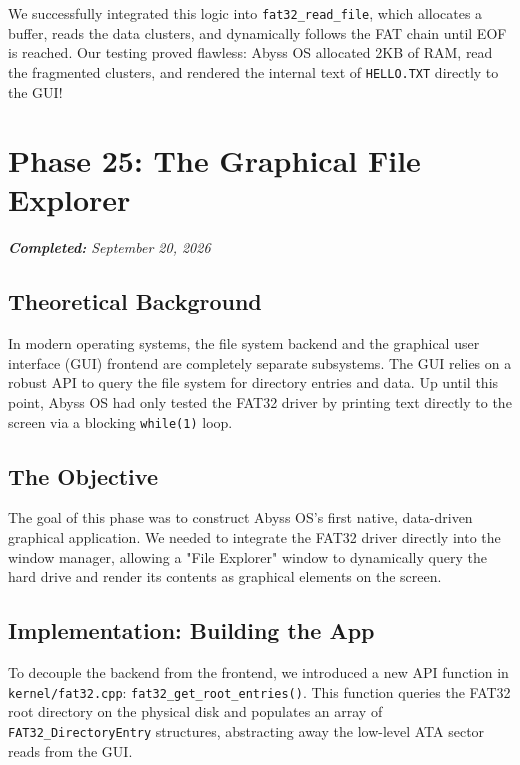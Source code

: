 \documentclass[12pt,a4paper]{report}
\begin{document}
We successfully integrated this logic into \texttt{fat32\_read\_file}, which allocates a buffer, reads the data clusters, and dynamically follows the FAT chain until EOF is reached. Our testing proved flawless: Abyss OS allocated 2KB of RAM, read the fragmented clusters, and rendered the internal text of \texttt{HELLO.TXT} directly to the GUI!

\newpage

\section{Phase 25: The Graphical File Explorer}
{\small\textit{\textbf{Completed:} September 20, 2026}}\par\medskip

\subsection{Theoretical Background}
In modern operating systems, the file system backend and the graphical user interface (GUI) frontend are completely separate subsystems. The GUI relies on a robust API to query the file system for directory entries and data. Up until this point, Abyss OS had only tested the FAT32 driver by printing text directly to the screen via a blocking \texttt{while(1)} loop.

\subsection{The Objective}
The goal of this phase was to construct Abyss OS's first native, data-driven graphical application. We needed to integrate the FAT32 driver directly into the window manager, allowing a "File Explorer" window to dynamically query the hard drive and render its contents as graphical elements on the screen.

\subsection{Implementation: Building the App}
To decouple the backend from the frontend, we introduced a new API function in \texttt{kernel/fat32.cpp}: \texttt{fat32\_get\_root\_entries()}. This function queries the FAT32 root directory on the physical disk and populates an array of \texttt{FAT32\_DirectoryEntry} structures, abstracting away the low-level ATA sector reads from the GUI.
\end{document}
